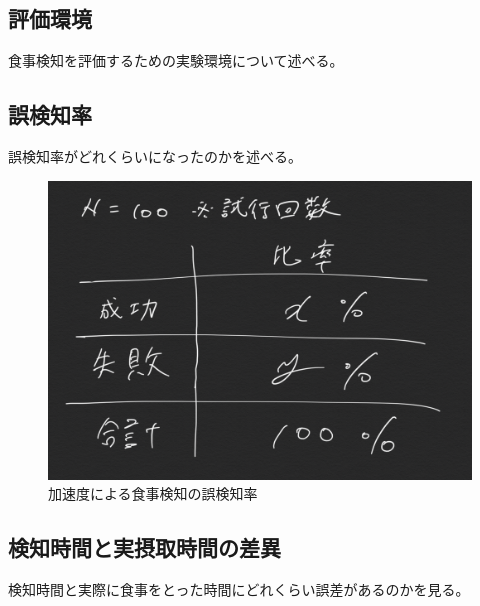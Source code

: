 \subsection{評価環境}
食事検知を評価するための実験環境について述べる。

\subsection{誤検知率}
誤検知率がどれくらいになったのかを述べる。

\begin{figure}[htbp]
  \caption{加速度による食事検知の誤検知率}
  \label{fig:success_failure_rate_meal}
  \begin{center}
    \includegraphics[bb=0 0 1000 450,width=20cm]{assets/success_failure_rate.png}
  \end{center}
\end{figure}

\subsection{検知時間と実摂取時間の差異}
検知時間と実際に食事をとった時間にどれくらい誤差があるのかを見る。

